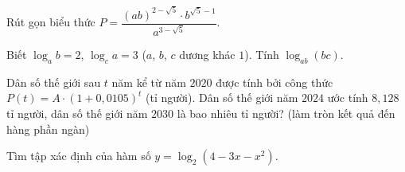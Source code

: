\def\thoigian{90}%

\begin{bt}%
Rút gọn biểu thức $P=\dfrac{(a b)^{2-\sqrt{5}} \cdot b^{\sqrt{5}-1}}{a^{3-\sqrt{5}}}$.
\end{bt}

\begin{bt}%
	Biết $\log _a b=2$, $\log _c a=3$ ($a$, $b$, $c$ dương khác $1$). Tính $\log _{a b}(b c)$.
\end{bt}

\begin{bt}%
	Dân số thế giới sau $t$ năm kể từ năm $2020$ được tính bởi công thức\\ $P(t)=A \cdot(1+0{,}0105)^{t}$ (tỉ người). Dân số thế giới năm $2024$ ước tính $8{,}128$ tỉ người, dân số thế giới năm $2030$ là bao nhiêu tỉ người? (làm tròn kết quả đến hàng phần ngàn)
\end{bt}

\begin{bt}%
	Tìm tập xác định của hàm số $y=\log _2\left(4-3 x-x^2\right)$.
\end{bt}

